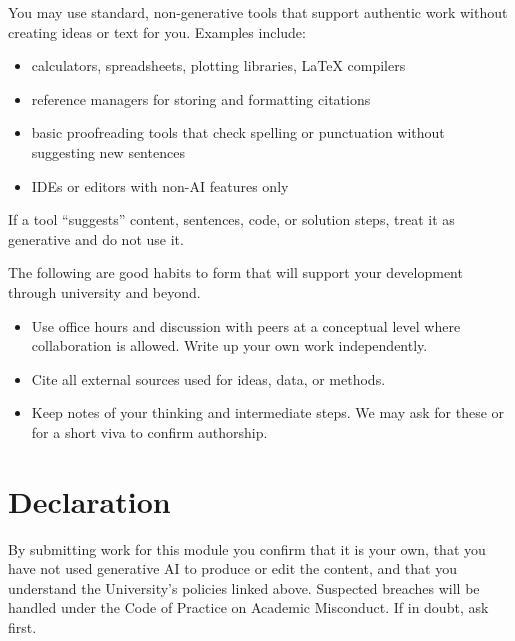 \documentclass[
  a4paper,
  DIV=11,
  numbers=noendperiod,
  oneside]{scrreprt}
\providecommand{\tightlist}{%
  \setlength{\itemsep}{0pt}\setlength{\parskip}{0pt}}
\begin{document}
You may use standard, non-generative tools that support authentic work
without creating ideas or text for you. Examples include:

\begin{itemize}
\tightlist
\item
  calculators, spreadsheets, plotting libraries, LaTeX compilers
\item
  reference managers for storing and formatting citations
\item
  basic proofreading tools that check spelling or punctuation without
  suggesting new sentences
\item
  IDEs or editors with non-AI features only
\end{itemize}

If a tool ``suggests'' content, sentences, code, or solution steps,
treat it as generative and do not use it.

\begin{tcolorbox}[enhanced jigsaw, colframe=quarto-callout-tip-color-frame, title=\textcolor{quarto-callout-tip-color}{\faLightbulb}\hspace{0.5em}{Getting help the right way}, breakable, opacityback=0, titlerule=0mm, colbacktitle=quarto-callout-tip-color!10!white, toptitle=1mm, colback=white, coltitle=black, toprule=.15mm, bottomtitle=1mm, left=2mm, arc=.35mm, rightrule=.15mm, bottomrule=.15mm, opacitybacktitle=0.6, leftrule=.75mm]

The following are good habits to form that will support your development
through university and beyond.

\begin{itemize}
\tightlist
\item
  Use office hours and discussion with peers at a conceptual level where
  collaboration is allowed. Write up your own work independently.
\item
  Cite all external sources used for ideas, data, or methods.
\item
  Keep notes of your thinking and intermediate steps. We may ask for
  these or for a short viva to confirm authorship.
\end{itemize}

\end{tcolorbox}

\section{Declaration}\label{declaration}

By submitting work for this module you confirm that it is your own, that
you have not used generative AI to produce or edit the content, and that
you understand the University's policies linked above. Suspected
breaches will be handled under the Code of Practice on Academic
Misconduct. If in doubt, ask first.
\end{document}
